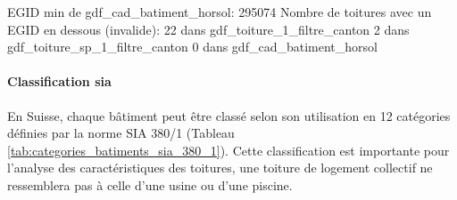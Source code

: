 \begin{textcode}
EGID min de gdf_cad_batiment_horsol: 295074
Nombre de toitures avec un EGID en dessous (invalide):
    22 dans gdf_toiture_1_filtre_canton
    2 dans gdf_toiture_sp_1_filtre_canton
    0 dans gdf_cad_batiment_horsol
\end{textcode}
\label{code:filtre_egid}

\paragraph{Classification \gls{sia}}
En Suisse, chaque bâtiment peut être classé selon son utilisation en 12 catégories définies par la norme SIA 380/1 (Tableau \ref{tab:categories_batiments_sia_380_1}). Cette classification est importante pour l'analyse des caractéristiques des toitures, une toiture de logement collectif ne ressemblera pas à celle d'une usine ou d'une piscine.

